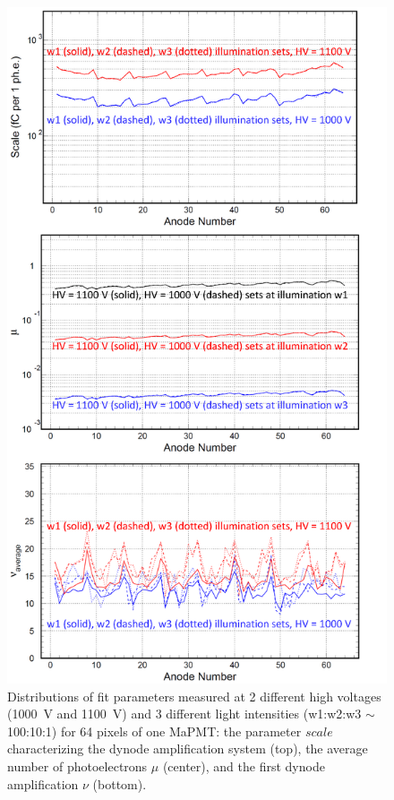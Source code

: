 \documentclass[5p,times,twocolumn]{elsarticle}
\begin{document}
\begin{figure}[b]
\begin{center}
	\includegraphics[width=1.05\linewidth]{H12700_passport.png}
	\caption{Distributions of fit parameters measured at 2 different high
          voltages  (1000~V and 1100~V) and 3 different  light intensities (w1:w2:w3 $\sim$ 100:10:1) for 64  pixels of one MaPMT: the parameter $scale$   characterizing
          the dynode amplification system (top), the average number of photoelectrons $\mu$ (center), and the first dynode amplification $\nu$ (bottom).}
	\label{fig:PavelPassport}
\end{center}
\end{figure}
\end{document}

